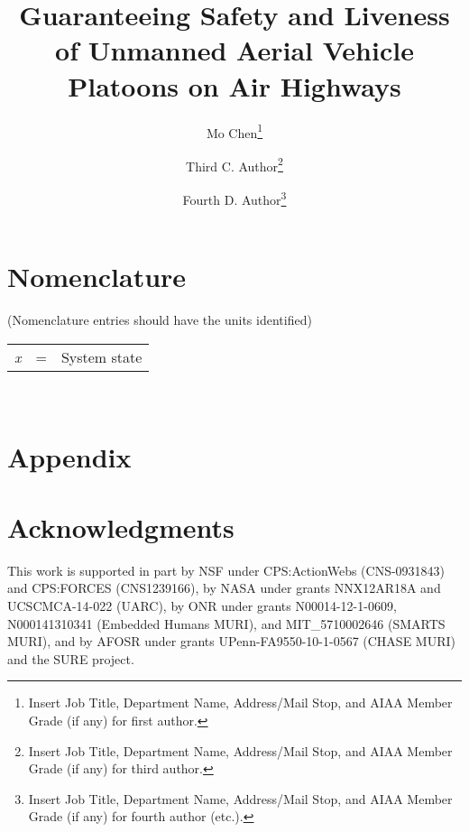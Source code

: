 \documentclass[letterpaper]{AIAA}
\begin{document}
\title{Guaranteeing Safety and Liveness of Unmanned Aerial Vehicle Platoons on Air Highways}

\author{Mo Chen\footnote{Insert Job Title, Department Name, Address/Mail Stop, and AIAA Member Grade (if any) for first author.}}
\author{Third C. Author\footnote{Insert Job Title, Department Name, Address/Mail Stop, and AIAA Member Grade (if any) for third author.}}
\author{Fourth D. Author\footnote{Insert Job Title, Department Name, Address/Mail Stop, and AIAA Member Grade (if any) for fourth author (etc.).}}

\begin{abstract}
\end{abstract}

\maketitle

\section*{Nomenclature}
(Nomenclature entries should have the units identified)\\
\noindent\begin{tabular}{@{}lcl@{}}
\textit{x}  &=& System state \\
\end{tabular} \\













\section*{Appendix}

\section*{Acknowledgments}
This work is supported in part by NSF under CPS:ActionWebs (CNS-0931843) and CPS:FORCES (CNS1239166), by NASA under grants NNX12AR18A and UCSCMCA-14-022 (UARC), by ONR under grants N00014-12-1-0609, N000141310341 (Embedded Humans MURI), and MIT\_5710002646 (SMARTS MURI), and by AFOSR under grants UPenn-FA9550-10-1-0567 (CHASE MURI) and the SURE project.
\end{document}
